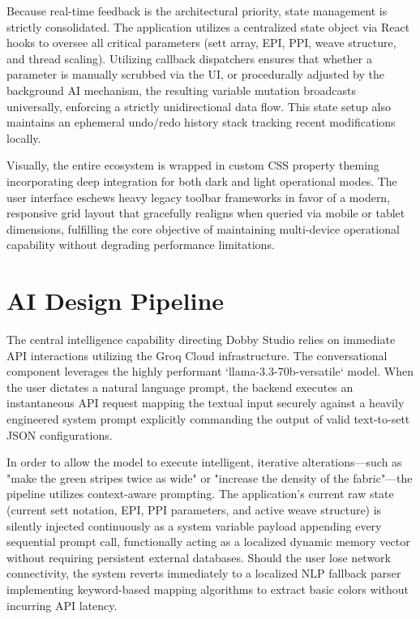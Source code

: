 Because real-time feedback is the architectural priority, state management is strictly consolidated. The application utilizes a centralized state object via React hooks to oversee all critical parameters (sett array, EPI, PPI, weave structure, and thread scaling). Utilizing callback dispatchers ensures that whether a parameter is manually scrubbed via the UI, or procedurally adjusted by the background AI mechanism, the resulting variable mutation broadcasts universally, enforcing a strictly unidirectional data flow. This state setup also maintains an ephemeral undo/redo history stack tracking recent modifications locally.

Visually, the entire ecosystem is wrapped in custom CSS property theming incorporating deep integration for both dark and light operational modes. The user interface eschews heavy legacy toolbar frameworks in favor of a modern, responsive grid layout that gracefully realigns when queried via mobile or tablet dimensions, fulfilling the core objective of maintaining multi-device operational capability without degrading performance limitations.

\section{AI Design Pipeline}
The central intelligence capability directing Dobby Studio relies on immediate API interactions utilizing the Groq Cloud infrastructure. The conversational component leverages the highly performant `llama-3.3-70b-versatile` model. When the user dictates a natural language prompt, the backend executes an instantaneous API request mapping the textual input securely against a heavily engineered system prompt explicitly commanding the output of valid text-to-sett JSON configurations.

In order to allow the model to execute intelligent, iterative alterations—such as "make the green stripes twice as wide" or "increase the density of the fabric"—the pipeline utilizes context-aware prompting. The application's current raw state (current sett notation, EPI, PPI parameters, and active weave structure) is silently injected continuously as a system variable payload appending every sequential prompt call, functionally acting as a localized dynamic memory vector without requiring persistent external databases. Should the user lose network connectivity, the system reverts immediately to a localized NLP fallback parser implementing keyword-based mapping algorithms to extract basic colors without incurring API latency.

